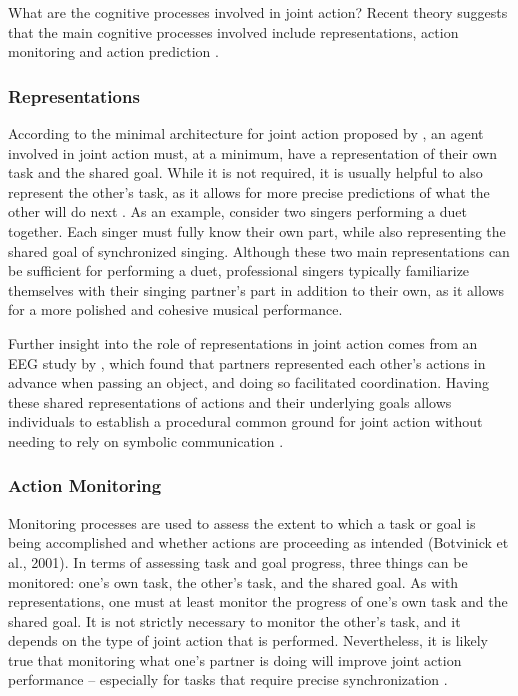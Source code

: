 \documentclass[10pt,a4paper,onecolumn]{article}
\begin{document}
What are the cognitive processes involved in joint action? Recent theory suggests that the main cognitive processes involved include representations, action monitoring and action prediction \autocite{vesperMinimalArchitectureJoint2010,loehrMonitoringIndividualJoint2013,sebanzJointActionBodies2006}.

\hypertarget{representations}{%
\subsubsection{Representations}\label{representations}}

According to the minimal architecture for joint action proposed by \textcite{vesperMinimalArchitectureJoint2010}, an agent involved in joint action must, at a minimum, have a representation of their own task and the shared goal. While it is not required, it is usually helpful to also represent the other's task, as it allows for more precise predictions of what the other will do next \autocite{boltSensoryAttenuationAuditory2021}. As an example, consider two singers performing a duet together. Each singer must fully know their own part, while also representing the shared goal of synchronized singing. Although these two main representations can be sufficient for performing a duet, professional singers typically familiarize themselves with their singing partner's part in addition to their own, as it allows for a more polished and cohesive musical performance.

Further insight into the role of representations in joint action comes from an EEG study by \textcite{kourtisPredictiveRepresentationOther2012}, which found that partners represented each other's actions in advance when passing an object, and doing so facilitated coordination. Having these shared representations of actions and their underlying goals allows individuals to establish a procedural common ground for joint action without needing to rely on symbolic communication \autocite{sebanzJointActionBodies2006}.

\hypertarget{action-monitoring}{%
\subsubsection{Action Monitoring}\label{action-monitoring}}

Monitoring processes are used to assess the extent to which a task or goal is being accomplished and whether actions are proceeding as intended (Botvinick et al., 2001). In terms of assessing task and goal progress, three things can be monitored: one's own task, the other's task, and the shared goal. As with representations, one must at least monitor the progress of one's own task and the shared goal. It is not strictly necessary to monitor the other's task, and it depends on the type of joint action that is performed. Nevertheless, it is likely true that monitoring what one's partner is doing will improve joint action performance -- especially for tasks that require precise synchronization \autocite{vesperMinimalArchitectureJoint2010}.
\end{document}
